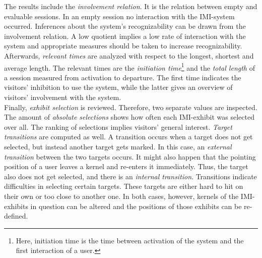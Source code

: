 The results include the \textit{involvement relation}. It is the relation between empty and evaluable sessions. In an empty session no interaction with the \ac{IMI}-system occurred. Inferences about the system's recognizability can be drawn from the involvement relation. A low quotient implies a low rate of interaction with the system and appropriate measures should be taken to increase recognizability.
\\
Afterwards, \textit{relevant times} are analyzed with respect to the longest, shortest and average length. The relevant times are the \textit{initiation time}\footnote{Here, initiation time is the time between activation of the system and the first interaction of a user.} and the \textit{total length} of a session measured from activation to departure. The first time indicates the visitors' inhibition to use the system, while the latter gives an overview of visitors' involvement with the system.
\\
Finally, \textit{exhibit selection} is reviewed. Therefore, two separate values are inspected. The amount of \textit{absolute selections} shows how often each \ac{IMI}-exhibit was selected over all. The ranking of selections implies visitors' general interest. \textit{Target transitions} are computed as well. A transition occurs when a target does not get selected, but instead another target gets marked. In this case, an \textit{external transition} between the two targets occurs. It might also happen that the pointing position of a user leaves a kernel and re-enters it immediately. Thus, the target also does not get selected, and there is an \textit{internal transition}. Transitions indicate difficulties in selecting certain targets. These targets are either hard to hit on their own or too close to another one. In both cases, however, kernels of the \ac{IMI}-exhibits in question can be altered and the positions of those exhibits can be re-defined.

%
